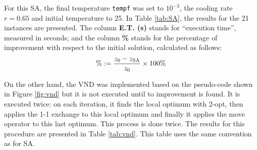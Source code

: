 \documentclass[10pt,twoside]{article}
\begin{document}
For this SA, the final temperature \texttt{tempf} was set to $10^{-3}$, the cooling rate $r=0.65$ and initial temperature to 25. In Table \ref{tab:SA}, the results for the 21 instances are presented. The column \textbf{E.T. (s)} stands for ``execution time'', measured in seconds; and the column \textbf{\%} stands for the percentage of improvement with respect to the initial solution, calculated as follows:
\[
\%:=\dfrac{z_0-z_{{\rm SA}}}{z_0}\times100\%
\]


On the other hand, the VND was implemented based on the pseudo-code shown in Figure \ref{fig:vnd} but it is not executed until to improvement is found. It is executed twice: on each iteration, it finds the local optimum with 2-opt, then applies the 1-1 exchange to this local optimum and finally it applies the move operator to this last optimum. This process is done twice. The results for this procedure are presented in Table \ref{tab:vnd}. This table uses the same convention as for SA.
\end{document}
